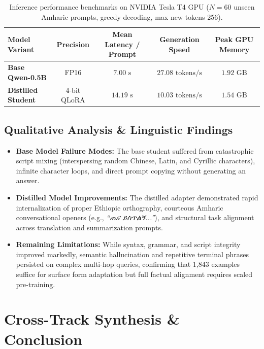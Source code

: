\documentclass[11pt,a4paper]{article}
\newcommand{\best}[1]{\cellcolor{bestcol}\textbf{#1}}
\begin{document}
\begin{table}[h!]
\centering
\caption{Inference performance benchmarks on NVIDIA Tesla T4 GPU ($N=60$ unseen Amharic prompts, greedy decoding, max new tokens 256).}
\vspace{4pt}
\begin{tabular}{lcccc}
    \toprule
    \textbf{Model Variant} & \textbf{Precision} & \textbf{Mean Latency / Prompt} & \textbf{Generation Speed} & \textbf{Peak GPU Memory} \\
    \midrule
    \textbf{Base Qwen-0.5B} & FP16 & $7.00\text{ s}$ & $27.08\text{ tokens/s}$ & $1.92\text{ GB}$ \\
    \textbf{Distilled Student} & 4-bit QLoRA & $14.19\text{ s}$ & $10.03\text{ tokens/s}$ & \best{$1.54\text{ GB}$} \\
    \bottomrule
\end{tabular}
\end{table}

\subsection{Qualitative Analysis \& Linguistic Findings}

\begin{itemize}[leftmargin=1.2cm]
    \item \textbf{Base Model Failure Modes:} The base student suffered from catastrophic script mixing (interspersing random Chinese, Latin, and Cyrillic characters), infinite character loops, and direct prompt copying without generating an answer.
    \item \textbf{Distilled Model Improvements:} The distilled adapter demonstrated rapid internalization of proper Ethiopic orthography, courteous Amharic conversational openers (e.g., \textit{``ጤና ይስጥልኝ...''}), and structural task alignment across translation and summarization prompts.
    \item \textbf{Remaining Limitations:} While syntax, grammar, and script integrity improved markedly, semantic hallucination and repetitive terminal phrases persisted on complex multi-hop queries, confirming that 1,843 examples suffice for surface form adaptation but full factual alignment requires scaled pre-training.
\end{itemize}

\section{Cross-Track Synthesis \& Conclusion}
\end{document}
